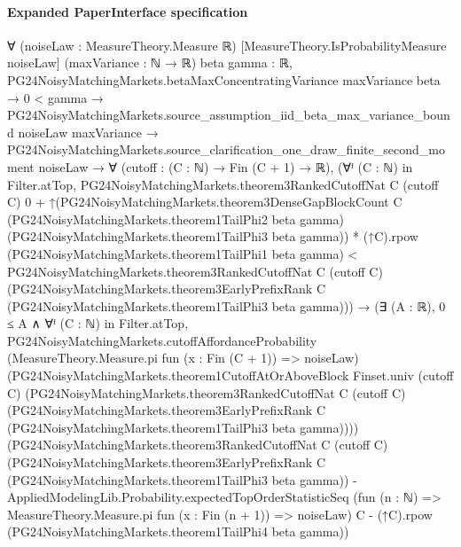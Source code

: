 \documentclass[10pt]{article}
\begin{document}
\paragraph{Expanded PaperInterface specification}
\begin{ReviewVerbatim}
∀ (noiseLaw : MeasureTheory.Measure ℝ) [MeasureTheory.IsProbabilityMeasure noiseLaw] (maxVariance : ℕ → ℝ)
  {beta gamma : ℝ},
  PG24NoisyMatchingMarkets.betaMaxConcentratingVariance maxVariance beta →
    0 < gamma →
      PG24NoisyMatchingMarkets.source_assumption_iid_beta_max_variance_bound noiseLaw maxVariance →
        PG24NoisyMatchingMarkets.source_clarification_one_draw_finite_second_moment noiseLaw →
          ∀ (cutoff : (C : ℕ) → Fin (C + 1) → ℝ),
            (∀ᶠ (C : ℕ) in Filter.atTop,
                PG24NoisyMatchingMarkets.theorem3RankedCutoffNat C (cutoff C) 0 +
                    ↑(PG24NoisyMatchingMarkets.theorem3DenseGapBlockCount C
                          (PG24NoisyMatchingMarkets.theorem1TailPhi2 beta gamma)
                          (PG24NoisyMatchingMarkets.theorem1TailPhi3 beta gamma)) *
                      (↑C).rpow (PG24NoisyMatchingMarkets.theorem1TailPhi1 beta gamma) <
                  PG24NoisyMatchingMarkets.theorem3RankedCutoffNat C (cutoff C)
                    (PG24NoisyMatchingMarkets.theorem3EarlyPrefixRank C
                      (PG24NoisyMatchingMarkets.theorem1TailPhi3 beta gamma))) →
              (∃ (A : ℝ),
                  0 ≤ A ∧
                    ∀ᶠ (C : ℕ) in Filter.atTop,
                      PG24NoisyMatchingMarkets.cutoffAffordanceProbability
                          (MeasureTheory.Measure.pi fun (x : Fin (C + 1)) => noiseLaw)
                          (PG24NoisyMatchingMarkets.theorem1CutoffAtOrAboveBlock Finset.univ (cutoff C)
                            (PG24NoisyMatchingMarkets.theorem3RankedCutoffNat C (cutoff C)
                              (PG24NoisyMatchingMarkets.theorem3EarlyPrefixRank C
                                (PG24NoisyMatchingMarkets.theorem1TailPhi3 beta gamma))))
                          (PG24NoisyMatchingMarkets.theorem3RankedCutoffNat C (cutoff C)
                                (PG24NoisyMatchingMarkets.theorem3EarlyPrefixRank C
                                  (PG24NoisyMatchingMarkets.theorem1TailPhi3 beta gamma)) -
                              AppliedModelingLib.Probability.expectedTopOrderStatisticSeq
                                (fun (n : ℕ) => MeasureTheory.Measure.pi fun (x : Fin (n + 1)) => noiseLaw) C -
                            (↑C).rpow (PG24NoisyMatchingMarkets.theorem1TailPhi4 beta gamma))

\end{ReviewVerbatim}
\end{document}
